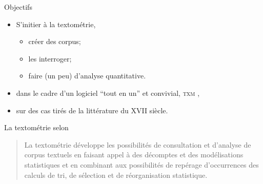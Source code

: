 \documentclass{beamer}
\begin{document}
\begin{frame}{Objectifs}
	
	\begin{itemize}
		\item S'initier à la \alert{textométrie},
		\begin{itemize}
			\item créer des corpus;
			\item les interroger;
			\item faire (un peu) d'analyse quantitative.
		\end{itemize}
		\item dans le cadre d'un logiciel ``tout en un'' et convivial, 
	\alert{\textsc{txm}} \cite{Heiden2010},
		\item sur des cas tirés de la littérature du XVII\ieme{} siècle.
	\end{itemize}


\begin{block}{La textométrie selon \cite{Pincemin2008}}
	\begin{quote}
		La   textométrie développe  les  possibilités  de  consultation  et  d'analyse  de
		corpus  textuels  en  faisant  appel  à  des  décomptes  et des
		modélisations  statistiques  et  en  combinant  aux  possibilités
		de repérage d'occurrences des calculs de tri, de sélection et
		de réorganisation statistique.
	\end{quote}
\end{block}
	
\end{frame}
\end{document}
